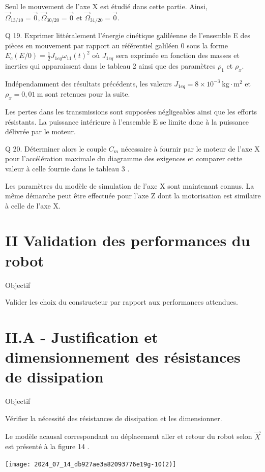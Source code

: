 \documentclass[10pt]{article}
\begin{document}
Seul le mouvement de l'axe X est étudié dans cette partie. Ainsi, $\vec{\Omega}_{13 / 10}=\overrightarrow{0}, \vec{\Omega}_{30 / 20}=\overrightarrow{0}$ et $\vec{\Omega}_{31 / 20}=\overrightarrow{0}$.

Q 19. Exprimer littéralement l'énergie cinétique galiléenne de l'ensemble E des pièces en mouvement par rapport au référentiel galiléen 0 sous la forme $E_{c}(E / 0)=\frac{1}{2} J_{1 e q} \omega_{11}(t)^{2}$ où $J_{1 e q}$ sera exprimée en fonction des masses et inerties qui apparaissent dans le tableau 2 ainsi que des paramètres $\rho_{1}$ et $\rho_{x}$.

Indépendamment des résultats précédents, les valeurs $J_{1 e q}=8 \times 10^{-3} \mathrm{~kg} \cdot \mathrm{m}^{2}$ et $\rho_{x}=0,01 \mathrm{~m}$ sont retenues pour la suite.

Les pertes dans les transmissions sont supposées négligeables ainsi que les efforts résistants. La puissance intérieure à l'ensemble E se limite donc à la puissance délivrée par le moteur.

Q 20. Déterminer alors le couple $C_{m}$ nécessaire à fournir par le moteur de l'axe X pour l'accélération maximale du diagramme des exigences et comparer cette valeur à celle fournie dans le tableau 3 .

Les paramètres du modèle de simulation de l'axe X sont maintenant connus. La même démarche peut être effectuée pour l'axe Z dont la motorisation est similaire à celle de l'axe X.

\section*{II Validation des performances du robot}
Objectif

Valider les choix du constructeur par rapport aux performances attendues.

\section*{II.A - Justification et dimensionnement des résistances de dissipation}
Objectif

Vérifier la nécessité des résistances de dissipation et les dimensionner.

Le modèle acausal correspondant au déplacement aller et retour du robot selon $\vec{X}$ est présenté à la figure 14 .

\begin{center}
\texttt{[image: 2024\_07\_14\_db927ae3a82093776e19g-10(2)]}
\end{center}
\end{document}
